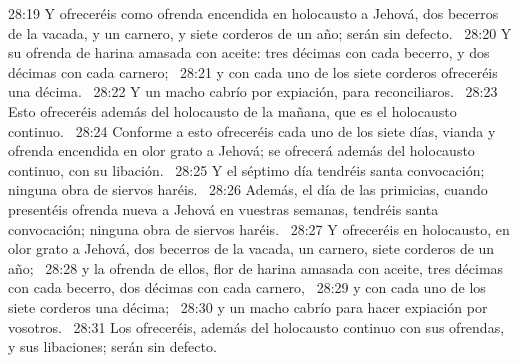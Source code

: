 28:19 Y ofreceréis como ofrenda encendida en holocausto a Jehová, dos becerros de la vacada, y un carnero, y siete corderos de un año; serán sin defecto.  
28:20 Y su ofrenda de harina amasada con aceite: tres décimas con cada becerro, y dos décimas con cada carnero;  
28:21 y con cada uno de los siete corderos ofreceréis una décima.  
28:22 Y un macho cabrío por expiación, para reconciliaros.  
28:23 Esto ofreceréis además del holocausto de la mañana, que es el holocausto continuo.  
28:24 Conforme a esto ofreceréis cada uno de los siete días, vianda y ofrenda encendida en olor grato a Jehová; se ofrecerá además del holocausto continuo, con su libación.  
28:25 Y el séptimo día tendréis santa convocación; ninguna obra de siervos haréis.  
28:26 Además, el día de las primicias, cuando presentéis ofrenda nueva a Jehová en vuestras semanas, tendréis santa convocación; ninguna obra de siervos haréis.  
28:27 Y ofreceréis en holocausto, en olor grato a Jehová, dos becerros de la vacada, un carnero, siete corderos de un año;  
28:28 y la ofrenda de ellos, flor de harina amasada con aceite, tres décimas con cada becerro, dos décimas con cada carnero,  
28:29 y con cada uno de los siete corderos una décima;  
28:30 y un macho cabrío para hacer expiación por vosotros.  
28:31 Los ofreceréis, además del holocausto continuo con sus ofrendas, y sus libaciones; serán sin defecto.  
